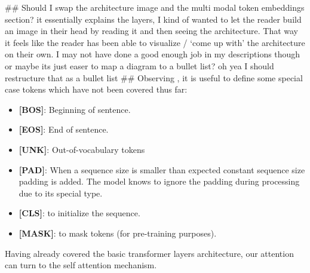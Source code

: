 \#\# Should I swap the architecture image and the multi modal token embeddings section? it essentially explains the
layers, I kind of wanted to let the reader build an image in their head by reading it and then seeing the architecture.
That way it feels like the reader has been able to visualize / `come up with' the  architecture on their own.
I may not have done a good enough job in my descriptions though or maybe its just easer to map a diagram to a bullet list?
oh yea I should restructure that as a bullet list
\#\#
Observing , it is useful to define some special case tokens which have not been covered thus far:
\begin{itemize}
	\item \textbf{[BOS]}: Beginning of sentence.
	\item \textbf{[EOS]}: End of sentence.
	\item \textbf{[UNK]}: Out-of-vocabulary tokens
	\item \textbf{[PAD]}: When a sequence size is smaller than expected constant sequence size padding is added. The model
	      knows to ignore the padding during processing due to its special type.
	\item \textbf{[CLS]}: to initialize the sequence.
	\item \textbf{[MASK]}: to mask tokens (for pre-training purposes).
\end{itemize}
Having already covered the basic transformer layers architecture, our attention can turn to the self attention mechanism.
